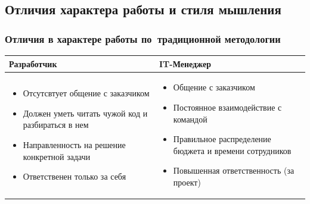 \documentclass{../industrial-development}
\begin{document}
\subsection{Отличия характера работы и стиля мышления}
\begin{frame} \frametitle{Отличия в характере работы по~традиционной методологии}

	 	\begin{table}[R]

\begin{center}
\begin{tabular}{|p{0.5\linewidth}|p{0.5\linewidth}|}
\hline
\textbf{Разработчик} & \textbf{IT-Менеджер} \\
\hline
\begin{itemize}
\item Отсутсвтует общение с заказчиком
\item Должен уметь читать чужой код и разбираться в нем
\item Направленность на решение конкретной задачи
\item Ответственен только за себя
\end{itemize}
 & 
\begin{itemize}
\item Общение с заказчиком
\item Постоянное взаимодействие с командой
\item Правильное распределение бюджета и времени сотрудников
\item Повышенная ответственность (за проект)
\end{itemize} \\
\hline
\end{tabular}
\end{center}
\end{table} 
\end{frame}
\lecturenotes
~\cite{How_to_be_a_good_IT-manager}
\end{document}
